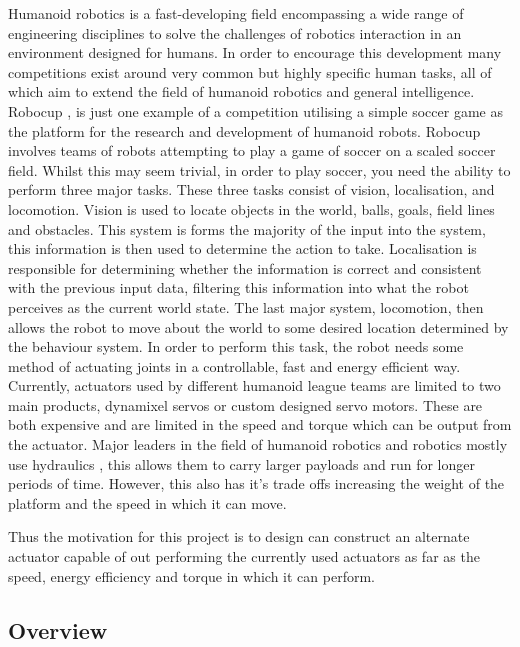 \documentclass[11pt,a4paper]{article}
\begin{document}
Humanoid robotics is a fast-developing field encompassing a wide range of engineering disciplines to solve the challenges of robotics interaction in an environment designed for humans. In order to encourage this development many competitions exist around very common but highly specific human tasks, all of which aim to extend the field of humanoid robotics and general intelligence. Robocup \cite{kitano1995robocup}, is just one example of a competition utilising a simple soccer game as the platform for the research and development of humanoid robots. Robocup involves teams of robots attempting to play a game of soccer on a scaled soccer field. Whilst this may seem trivial, in order to play soccer, you need the ability to perform three major tasks. These three tasks consist of vision, localisation, and locomotion. Vision is used to locate objects in the world, balls, goals, field lines and obstacles. This system is forms the majority of the input into the system, this information is then used to determine the action to take. Localisation is responsible for determining whether the information is correct and consistent with the previous input data, filtering this information into what the robot perceives as the current world state. The last major system, locomotion, then allows the robot to move about the world to some desired location determined by the behaviour system. In order to perform this task, the robot needs some method of actuating joints in a controllable, fast and energy efficient way. Currently, actuators used by different humanoid league teams are limited to two main products, dynamixel servos \cite{robotis_mx106} or custom designed servo motors. These are both expensive and are limited in the speed and torque which can be output from the actuator. Major leaders in the field of humanoid robotics and robotics mostly use hydraulics \cite{atlas}, this allows them to carry larger payloads and run for longer periods of time. However, this also has it's trade offs increasing the weight of the platform and the speed in which it can move. \newline

Thus the motivation for this project is to design can construct an alternate actuator capable of out performing the currently used actuators as far as the speed, energy efficiency and torque in which it can perform. 

\subsection{Overview}
\label{sub:overview}
\end{document}
